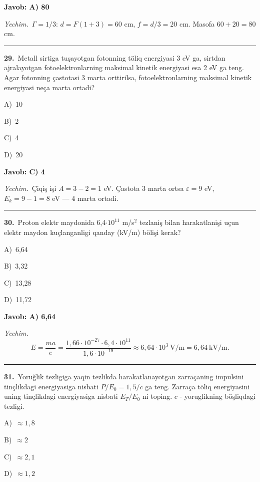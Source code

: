 \documentclass[11pt,a4paper]{article}
\newcommand{\opt}[2]{\hspace*{4mm}#1)\ #2\par}
\begin{document}
\noindent\colorbox{gray!12}{\parbox{\dimexpr\linewidth-2\fboxsep}{\textbf{Javob: A) 80}}}\par\smallskip
\noindent\textit{Yechim.}\ $\Gamma=1/3$: $d=F(1+3)=60$ cm, $f=d/3=20$ cm. Masofa $60+20=80$ cm.\par\par\medskip\hrule\medskip
{}\noindent\begin{minipage}{\linewidth}
\textbf{29.}\ Metall sirtiga tuşayotgan fotonning töliq energiyasi 3 eV ga, sirtdan ajralayotgan fotoelektronlarning maksimal kinetik energiyasi esa 2 eV ga teng. Agar fotonning çastotasi 3 marta orttirilsa, fotoelektronlarning maksimal kinetik energiyasi neça marta ortadi?\par\smallskip
\opt{A}{10}
\opt{B}{2}
\opt{C}{4}
\opt{D}{20}
\end{minipage}\vspace{2pt}\par
\noindent\colorbox{gray!12}{\parbox{\dimexpr\linewidth-2\fboxsep}{\textbf{Javob: C) 4}}}\par\smallskip
\noindent\textit{Yechim.}\ Çiqiş işi $A=3-2=1$ eV. Çastota 3 marta ortsa $\varepsilon=9$ eV, $E_k=9-1=8$ eV — 4 marta ortadi.\par\par\medskip\hrule\medskip
{}\noindent\begin{minipage}{\linewidth}
\textbf{30.}\ Proton elektr maydonida 6,4$\cdot10^{11}$ m/s$^{2}$ tezlaniş bilan harakatlanişi uçun elektr maydon kuçlanganligi qanday (kV/m) bölişi kerak?\par\smallskip
\opt{A}{6,64}
\opt{B}{3,32}
\opt{C}{13,28}
\opt{D}{11,72}
\end{minipage}\vspace{2pt}\par
\noindent\colorbox{gray!12}{\parbox{\dimexpr\linewidth-2\fboxsep}{\textbf{Javob: A) 6,64}}}\par\smallskip
\noindent\textit{Yechim.}\ \[E=\frac{ma}{e}=\frac{1{,}66\cdot10^{-27}\cdot6{,}4\cdot10^{11}}{1{,}6\cdot10^{-19}}\approx6{,}64\cdot10^3\ \text{V/m}=6{,}64\ \text{kV/m}.\]\par\medskip\hrule\medskip
{}\noindent\begin{minipage}{\linewidth}
\textbf{31.}\ Yoruğlik tezligiga yaqin tezlikda harakatlanayotgan zarraçaning impulsini tinçlikdagi energiyasiga nisbati $P/E_0=1{,}5/c$ ga teng. Zarraça töliq energiyasini uning tinçlikdagi energiyasiga nisbati $E_T/E_0$ ni toping. $c$ - yoruglikning böşliqdagi tezligi.\par\smallskip
\opt{A}{$\approx1{,}8$}
\opt{B}{$\approx2$}
\opt{C}{$\approx2{,}1$}
\opt{D}{$\approx1{,}2$}
\end{minipage}\vspace{2pt}\par
\end{document}
